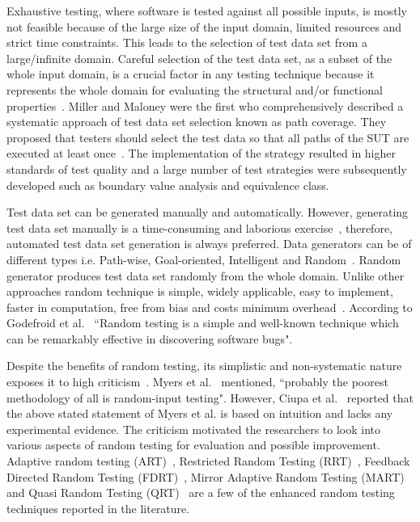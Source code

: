 Exhaustive testing, where software is tested against all possible inputs, is mostly not feasible because of the large size of the input domain, limited resources and strict time constraints. This leads to the selection of test data set from a large/infinite domain. Careful selection of the test data set, as a subset of the whole input domain, is a crucial factor in any testing technique because it represents the whole domain for evaluating the structural and/or functional properties~\cite{howden1986functional, mccabe1983structured}. Miller and Maloney were the first who comprehensively described a systematic approach of test data set selection known as path coverage. They proposed that testers should select the test data so that all paths of the SUT are executed at least once~\cite{miller1963systematic}. The implementation of the strategy resulted in higher standards of test quality and a large number of test strategies were subsequently developed such as boundary value analysis and equivalence class.

Test data set can be generated manually and automatically. However, generating test data set manually is a time-consuming and laborious exercise~\cite{korel1990automated}, therefore, automated test data set generation is always preferred. Data generators can be of different types i.e. Path-wise, Goal-oriented, Intelligent and Random~\cite{wiki2013}. Random generator produces test data set randomly from the whole domain. Unlike other approaches random technique is simple, widely applicable, easy to implement, faster in computation, free from bias and costs minimum overhead~\cite{ciupa2007experimental}. According to Godefroid et al.~\cite{godefroid2005dart} ``Random testing is a simple and well-known technique which can be remarkably effective in discovering software bugs".

Despite the benefits of random testing, its simplistic and non-systematic nature exposes it to high criticism~\cite{white1987software}. Myers et al.~\cite{myers2011art} mentioned, ``probably the poorest methodology of all is random-input testing". However, Ciupa et al.~\cite{ciupa2008artoo} reported that the above stated statement of Myers et al. is based on intuition and lacks any experimental evidence. The criticism motivated the researchers to look into various aspects of random testing for evaluation and possible improvement. Adaptive random testing (ART)~\cite{chen2005adaptive}, Restricted Random Testing (RRT)~\cite{chan2006restricted}, Feedback Directed Random Testing (FDRT)~\cite{pacheco2007randoop}, Mirror Adaptive Random Testing (MART)~\cite{chen2004mirror} and Quasi Random Testing (QRT)~\cite{chen2007quasi} are a few of the enhanced random testing techniques reported in the literature.

